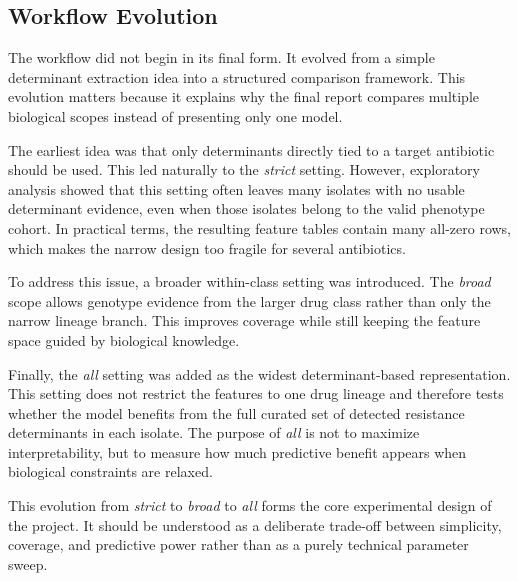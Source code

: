 \subsection{Workflow Evolution}

The workflow did not begin in its final form. It evolved from a simple determinant extraction idea into a structured comparison framework. This evolution matters because it explains why the final report compares multiple biological scopes instead of presenting only one model.

The earliest idea was that only determinants directly tied to a target antibiotic should be used. This led naturally to the \textit{strict} setting. However, exploratory analysis showed that this setting often leaves many isolates with no usable determinant evidence, even when those isolates belong to the valid phenotype cohort. In practical terms, the resulting feature tables contain many all-zero rows, which makes the narrow design too fragile for several antibiotics.

To address this issue, a broader within-class setting was introduced. The \textit{broad} scope allows genotype evidence from the larger drug class rather than only the narrow lineage branch. This improves coverage while still keeping the feature space guided by biological knowledge.

Finally, the \textit{all} setting was added as the widest determinant-based representation. This setting does not restrict the features to one drug lineage and therefore tests whether the model benefits from the full curated set of detected resistance determinants in each isolate. The purpose of \textit{all} is not to maximize interpretability, but to measure how much predictive benefit appears when biological constraints are relaxed.

This evolution from \textit{strict} to \textit{broad} to \textit{all} forms the core experimental design of the project. It should be understood as a deliberate trade-off between simplicity, coverage, and predictive power rather than as a purely technical parameter sweep.
